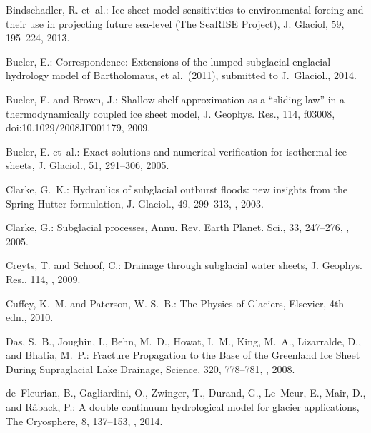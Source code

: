 \documentclass[gmd]{copernicus}   %
\begin{document}
\begin{thebibliography}{}
Bindschadler, R. et~al.: Ice-sheet model sensitivities to environmental forcing
  and their use in projecting future sea-level ({T}he {S}ea{RISE} {P}roject),
  J. Glaciol, 59, 195--224, 2013.

Bueler, E.: Correspondence: Extensions of the lumped subglacial-englacial
  hydrology model of {B}artholomaus, et al.~(2011), submitted to J.~Glaciol.,
  2014.

Bueler, E. and Brown, J.: Shallow shelf approximation as a ``sliding law'' in a
  thermodynamically coupled ice sheet model, J. Geophys. Res., 114, f03008,
  doi:10.1029/2008JF001179, 2009.

Bueler, E. et~al.: Exact solutions and numerical verification for isothermal ice sheets,
  J. Glaciol., 51, 291--306, 2005.

Clarke, G.~K.: Hydraulics of subglacial outburst floods: new insights from the
  {Spring-Hutter} formulation, J. Glaciol., 49, 299--313,
  , 2003.

Clarke, G.: Subglacial processes, Annu. Rev. Earth Planet. Sci., 33,
  247--276, , 2005.

Creyts, T. and Schoof, C.: Drainage through subglacial water sheets, J.
  Geophys. Res., 114, , 2009.

Cuffey, K.~M. and Paterson, W. S.~B.: The {P}hysics of {G}laciers, Elsevier,
  4th edn., 2010.

Das, S.~B., Joughin, I., Behn, M.~D., Howat, I.~M., King, M.~A., Lizarralde,
  D., and Bhatia, M.~P.: {Fracture Propagation to the Base of the Greenland Ice
  Sheet During Supraglacial Lake Drainage}, Science, 320, 778--781,
  , 2008.

de~Fleurian, B., Gagliardini, O., Zwinger, T., Durand, G., Le~Meur, E., Mair,
  D., and R{\aa}back, P.: A double continuum hydrological model for glacier
  applications, The Cryosphere, 8, 137--153, , 2014.


\end{thebibliography}
\end{document}
